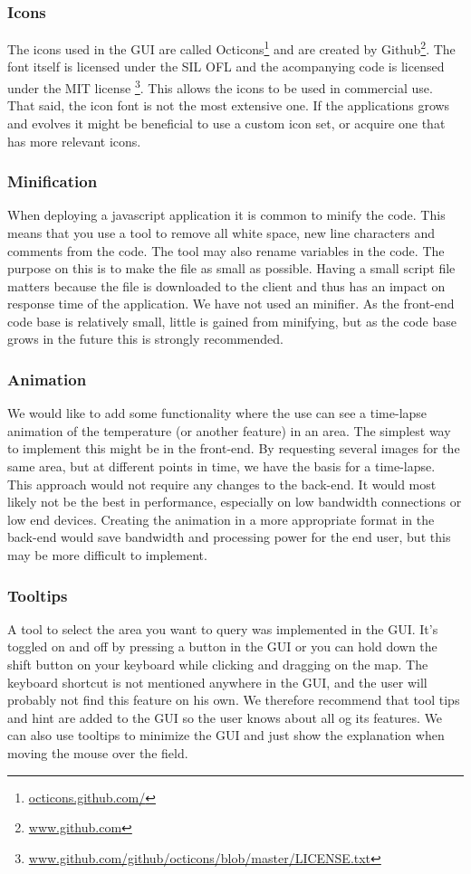 \documentclass[11pt,a4paper,titlepage,oneside]{report}
\begin{document}
\subsubsection{Icons}
The icons used in the GUI are called Octicons\footnote{\url{octicons.github.com/}} and are created by Github\footnote{\url{www.github.com}}. The font itself is licensed under the SIL OFL and the acompanying code is licensed under the MIT license \footnote{\url{www.github.com/github/octicons/blob/master/LICENSE.txt}}. This allows the icons to be used in commercial use. That said, the icon font is not the most extensive one. If the applications grows and evolves it might be beneficial to use a custom icon set, or acquire one that has more relevant icons.

\subsubsection{Minification}
When deploying a javascript application it is common to minify the code. This means that you use a tool to remove all white space, new line characters and comments from the code. The tool may also rename variables in the code. The purpose on this is to make the file as small as possible. Having a small script file matters because the file is downloaded to the client and thus has an impact on response time of the application. We have not used an minifier. As the \gls{front-end} code base is relatively small, little is gained from minifying, but as the code base grows in the future this is strongly recommended.

\subsubsection{Animation}
We would like to add some functionality where the use can see a time-lapse animation of the temperature (or another feature) in an area. The simplest way to implement this might be in the \gls{front-end}. By requesting several images for the same area, but at different points in time, we have the basis for a time-lapse. This approach would not require any changes to the back-end. It would most likely not be the best in performance, especially on low bandwidth connections or low end devices. Creating the animation in a more appropriate format in the back-end would save bandwidth and processing power for the end user, but this may be more difficult to implement.

\subsubsection{Tooltips}
A tool to select the area you want to query was implemented in the \gls{GUI}. It's toggled on and off by pressing a button in the \gls{GUI} or you can hold down the shift button on your keyboard while clicking and dragging on the map. The keyboard shortcut is not mentioned anywhere in the \gls{GUI}, and the user will probably not find this feature on his own. We therefore recommend that tool tips and hint are added to the \gls{GUI} so the user knows about all og its features. We can also use tooltips to minimize the \gls{GUI} and just show the explanation when moving the mouse over the field.
\end{document}

